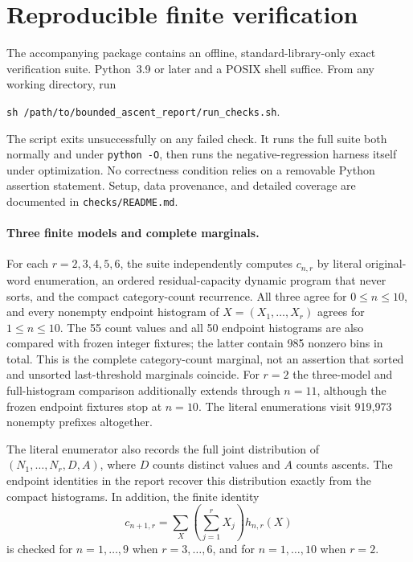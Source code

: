 \documentclass[11pt,letterpaper]{article}
\theoremstyle{remark}\newtheorem{remark}[theorem]{Remark}
\begin{document}
\section{Reproducible finite verification}
\label{amc:bm:sec:checks}
The accompanying package contains an offline, standard-library-only exact
verification suite.  Python~3.9 or later and a POSIX shell suffice.  From any
working directory, run
\begin{center}
\texttt{sh /path/to/bounded\_ascent\_report/run\_checks.sh}.
\end{center}
The script exits unsuccessfully on any failed check.  It runs the full suite
both normally and under \texttt{python -O}, then runs the negative-regression
harness itself under optimization.  No correctness condition relies on a
removable Python assertion statement.  Setup, data provenance, and detailed
coverage are documented in \texttt{checks/README.md}.

\paragraph{Three finite models and complete marginals.}
For each $r=2,3,4,5,6$, the suite independently computes $c_{n,r}$ by literal
original-word enumeration, an ordered residual-capacity dynamic program that
never sorts, and the compact category-count recurrence.  All three agree for
$0\le n\le10$, and every nonempty endpoint histogram of
$X=(X_1,\ldots,X_r)$ agrees for $1\le n\le10$.  The 55 count values and all
50 endpoint histograms are also compared with frozen integer fixtures; the
latter contain 985 nonzero bins in total.  This is the complete category-count
marginal, not an assertion that sorted and unsorted last-threshold marginals
coincide.  For $r=2$ the three-model and full-histogram comparison additionally
extends through $n=11$, although the frozen endpoint fixtures stop at $n=10$.
The literal enumerations visit 919,973 nonempty prefixes altogether.

The literal enumerator also records the full joint distribution of
$(N_1,\ldots,N_r,D,A)$, where $D$ counts distinct values and $A$ counts ascents.
The endpoint identities in the report recover this distribution exactly from
the compact histograms.  In addition, the finite identity
\[
 c_{n+1,r}=\sum_X\left(\sum_{j=1}^r X_j\right)h_{n,r}(X)
\]
is checked for $n=1,\ldots,9$ when $r=3,\ldots,6$, and for
$n=1,\ldots,10$ when $r=2$.
\end{document}
